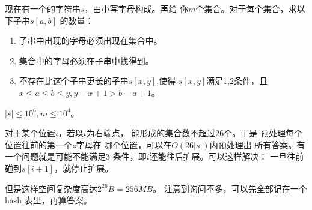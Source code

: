 \begin{prob}
	现在有一个的字符串$s$，由小写字母构成。再给
	你$m$个集合。对于每个集合，求以下子串$s[a,b]$
	的数量：
	\begin{enumerate}
		\item 子串中出现的字母必须出现在集合中。
		\item 集合中的字母必须在子串中找得到。
		\item 不存在比这个子串更长的子串$s[x,y]$,使得
		$s[x,y]$满足1,2条件，且$x\le a\le b\le y,y-x+1>b-a+1$。
	\end{enumerate}
	$|s| \le 10^6, m \le 10^4$。
\end{prob}

\begin{sol}
	对于某个位置$i$，若以$i$为右端点，
	能形成的集合数不超过$26$个。于是
	预处理每个位置往前的第一个$z$字母在
	哪个位置，可以在$O(26|s|)$内预处理出
	所有答案。有一个问题就是可能不能满足3
	条件，即$i$还能往后扩展。可以这样解决：
	一旦往前碰到$s[i+1]$，就停止扩展。\par
	但是这样空间复杂度高达$2^{26}B=256MB$。
	注意到询问不多，可以先全部记在一个hash
	表里，再算答案。
\end{sol}
